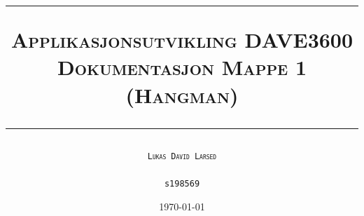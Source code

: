 \begin{titlepage}
 



\title{
\rule{\linewidth}{0.5mm}
\textsc{\LARGE Applikasjonsutvikling DAVE3600\\ \large Dokumentasjon Mappe 1 (Hangman)}
\rule{\linewidth}{0.5mm}
}





\author{\LARGE \textsc{\texttt{Lukas David Larsed}}\\ \\ \LARGE \texttt{s198569}}



\date{\today}



\end{titlepage}
